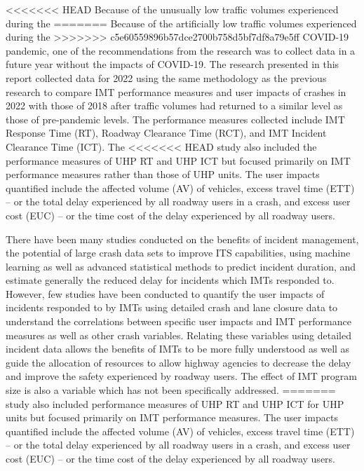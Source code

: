 \documentclass[
  letterpaper,
  authoryear]{elsarticle}
\begin{document}
<<<<<<< HEAD
Because of the unusually low traffic volumes experienced during the
=======
Because of the artificially low traffic volumes experienced during the
>>>>>>> c5e60559896b57dce2700b758d5bf7df8a79e5ff
COVID-19 pandemic, one of the recommendations from the research was to
collect data in a future year without the impacts of COVID-19. The
research presented in this report collected data for 2022 using the same
methodology as the previous research to compare IMT performance measures
and user impacts of crashes in 2022 with those of 2018 after traffic
volumes had returned to a similar level as those of pre-pandemic levels.
The performance measures collected include IMT Response Time (RT),
Roadway Clearance Time (RCT), and IMT Incident Clearance Time (ICT). The
<<<<<<< HEAD
study also included the performance measures of UHP RT and UHP ICT but
focused primarily on IMT performance measures rather than those of UHP
units. The user impacts quantified include the affected volume (AV) of
vehicles, excess travel time (ETT) -- or the total delay experienced by
all roadway users in a crash, and excess user cost (EUC) -- or the time
cost of the delay experienced by all roadway users.

There have been many studies conducted on the benefits of incident
management, the potential of large crash data sets to improve ITS
capabilities, using machine learning as well as advanced statistical
methods to predict incident duration, and estimate generally the reduced
delay for incidents which IMTs responded to. However, few studies have
been conducted to quantify the user impacts of incidents responded to by
IMTs using detailed crash and lane closure data to understand the
correlations between specific user impacts and IMT performance measures
as well as other crash variables. Relating these variables using
detailed incident data allows the benefits of IMTs to be more fully
understood as well as guide the allocation of resources to allow highway
agencies to decrease the delay and improve the safety experienced by
roadway users. The effect of IMT program size is also a variable which
has not been specifically addressed.
=======
study also included performance measures of UHP RT and UHP ICT for UHP
units but focused primarily on IMT performance measures. The user
impacts quantified include the affected volume (AV) of vehicles, excess
travel time (ETT) -- or the total delay experienced by all roadway users
in a crash, and excess user cost (EUC) -- or the time cost of the delay
experienced by all roadway users.
\end{document}
